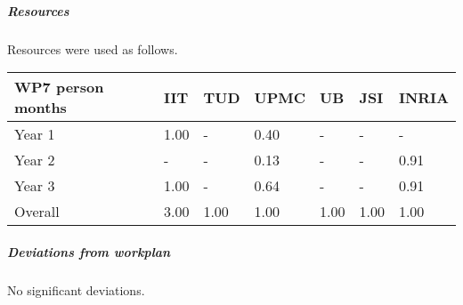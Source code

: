 

\subparagraph{Resources}

Resources were used as follows.

\begin{center}
\begin{tabular}{|C{1.5cm}|C{1.5cm}|C{1.5cm}|C{2cm}|C{2cm}|C{2cm}|C{2cm}|}
\hline
\footnotesize \textbf{WP7 person months}& \footnotesize \textbf{IIT}&\footnotesize \textbf{TUD}&\footnotesize \textbf{UPMC}& \footnotesize \textbf{UB} &\footnotesize \textbf{JSI} & \footnotesize \textbf{INRIA} \\ \hline
\footnotesize Year 1 &  1.00 & -    & 0.40 & -    & -    & - \\  \hline
\footnotesize Year 2 &  -    & -    & 0.13 & -    & -    & 0.91 \\  \hline
\footnotesize Year 3 &  1.00 & - & 0.64 & - & - & 0.91\\
\hline \hline
\footnotesize Overall & 3.00 & 1.00 & 1.00 & 1.00 & 1.00 & 1.00 \\ \hline
\end{tabular}
\end{center}

\subparagraph{Deviations from workplan} 
No significant deviations. 